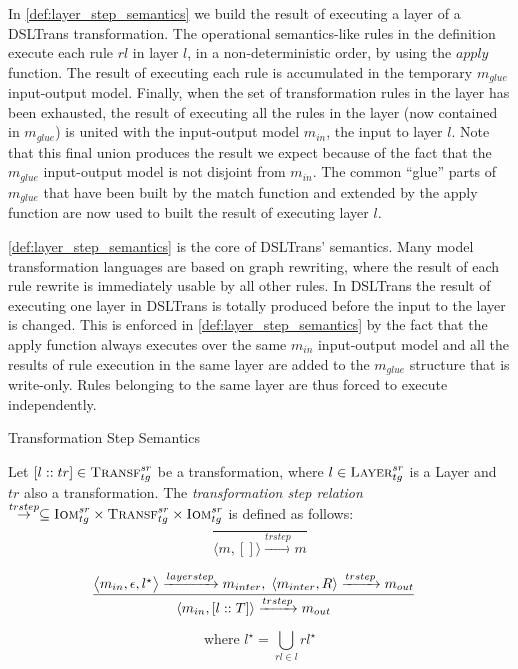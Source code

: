 
In \cref{def:layer_step_semantics} we build the result of executing a layer of a DSLTrans transformation. The operational semantics-like rules in the definition execute each rule $rl$ in layer $l$, in a non-deterministic order, by using the $apply$ function. The result of executing each rule is accumulated in the temporary $m_{glue}$ input-output model. Finally, when the set of transformation rules in the layer has been exhausted, the result of executing all the rules in the layer (now contained in $m_{glue}$) is united with the input-output model $m_{in}$, the input to layer $l$. Note that this final union produces the result we expect because of the fact that the $m_{glue}$ input-output model is not disjoint from $m_{in}$. The common ``glue'' parts of $m_{glue}$ that have been built by the match function and extended by the apply function are now used to built the result of executing layer $l$.

\cref{def:layer_step_semantics} is the core of DSLTrans' semantics. Many model transformation languages are based on graph rewriting, where the result of each rule rewrite is immediately usable by all other rules. In DSLTrans the result of executing one layer in DSLTrans is totally produced before the input to the layer is changed. This is enforced in \cref{def:layer_step_semantics} by the fact that the apply function always executes over the same $m_{in}$ input-output model and all the results of rule execution in the same layer are added to the $m_{glue}$ structure that is write-only. Rules belonging to the same layer are thus forced to execute independently.


\begin{definition} {Transformation Step Semantics}
\label{def:transformation_step_semantics}

Let $[l::tr]\in \textsc{Transf}^{sr}_{tg}$ be a transformation, where $l\in
\textsc{Layer}^{sr}_{tg}$ is a Layer and $tr$ also a transformation. The \emph{transformation step relation}
$\stackrel{trstep}{\rightarrow}\subseteq \textsc{Iom}^{sr}_{tg}\times \textsc{Transf}^{sr}_{tg}\times
\textsc{Iom}^{sr}_{tg}$ is defined as follows: 
$$\frac{}{\langle m,[]\rangle \xrightarrow{trstep} m}$$

$$\frac{\big\langle m_{in},\epsilon,l^{\star}\big\rangle \xrightarrow{layerstep} m_{inter},\; \langle m_{inter},R\rangle \xrightarrow{trstep} m_{out}}{\langle m_{in},[l::T]\rangle \xrightarrow{trstep} m_{out}} \hspace{.3cm}$$

$$\text{where } l^{\star}=\bigcup_{rl\in l}rl^{\star}$$
\end{definition}

